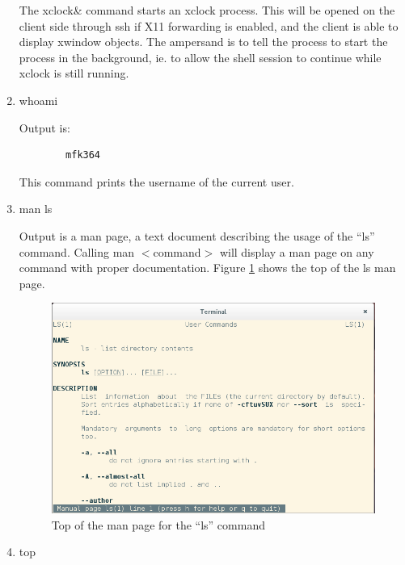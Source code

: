 \documentclass[a4paper,12pt]{UoBnote}
\begin{document}
\begin{enumerate}[label=\alph*)]
		The xclock\& command starts an xclock process. This will be opened on the client side through ssh if X11 forwarding is enabled, and the client is able to display xwindow objects. The ampersand is to tell the process to start the process in the background, ie. to allow the shell session to continue while xclock is still running.
	\item whoami

		Output is:
		\begin{verbatim}
		mfk364
		\end{verbatim}

		This command prints the username of the current user.

	\item man ls

		Output is a man page, a text document describing the usage of the ``ls'' command. Calling man $<$command$>$ will display a man page on any command with proper documentation. Figure \ref{fig:manpage} shows the top of the ls man page.
		\begin{figure}
			\centering
			\includegraphics[scale=0.3]{manls}
			\caption{Top of the man page for the ``ls'' command}
			\label{fig:manpage}
		\end{figure}

	\item top


\end{enumerate}
\end{document}
